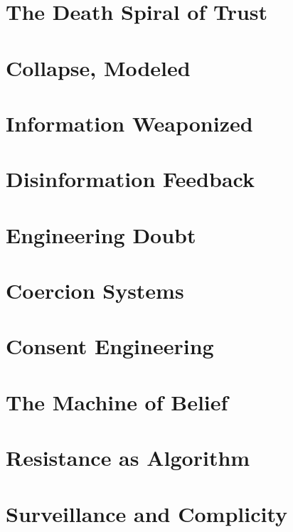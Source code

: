 \documentclass[12pt]{book}
\begin{document}
\chapter{The Death Spiral of Trust}


\chapter{Collapse, Modeled}


\chapter{Information Weaponized}


\chapter{Disinformation Feedback}


\chapter{Engineering Doubt}


\chapter{Coercion Systems}


\chapter{Consent Engineering}


\chapter{The Machine of Belief}


\chapter{Resistance as Algorithm}


\chapter{Surveillance and Complicity}

\end{document}
